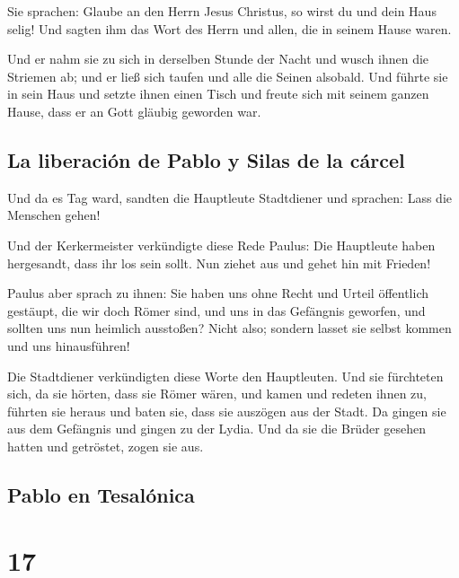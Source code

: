  Sie sprachen: Glaube an den Herrn Jesus Christus, so
wirst du und dein Haus selig!  Und sagten ihm das Wort
des Herrn und allen, die in seinem Hause waren.

 Und er nahm sie zu sich in derselben Stunde der Nacht
und wusch ihnen die Striemen ab; und er ließ sich taufen und alle die
Seinen alsobald.  Und führte sie in sein Haus und setzte
ihnen einen Tisch und freute sich mit seinem ganzen Hause, dass er an
Gott gläubig geworden war.

\hypertarget{la-liberaciuxf3n-de-pablo-y-silas-de-la-cuxe1rcel}{%
\subsection{La liberación de Pablo y Silas de la
cárcel}\label{la-liberaciuxf3n-de-pablo-y-silas-de-la-cuxe1rcel}}

 Und da es Tag ward, sandten die Hauptleute Stadtdiener
und sprachen: Lass die Menschen gehen!

 Und der Kerkermeister verkündigte diese Rede Paulus: Die
Hauptleute haben hergesandt, dass ihr los sein sollt. Nun ziehet aus und
gehet hin mit Frieden!

 Paulus aber sprach zu ihnen: Sie haben uns ohne Recht
und Urteil öffentlich gestäupt, die wir doch Römer sind, und uns in das
Gefängnis geworfen, und sollten uns nun heimlich ausstoßen? Nicht also;
sondern lasset sie selbst kommen und uns hinausführen!

 Die Stadtdiener verkündigten diese Worte den
Hauptleuten. Und sie fürchteten sich, da sie hörten, dass sie Römer
wären,  und kamen und redeten ihnen zu, führten sie
heraus und baten sie, dass sie auszögen aus der Stadt. 
Da gingen sie aus dem Gefängnis und gingen zu der Lydia. Und da sie die
Brüder gesehen hatten und getröstet, zogen sie aus.

\hypertarget{pablo-en-tesaluxf3nica}{%
\subsection{Pablo en Tesalónica}\label{pablo-en-tesaluxf3nica}}

\hypertarget{section-16}{%
\section{17}\label{section-16}}

